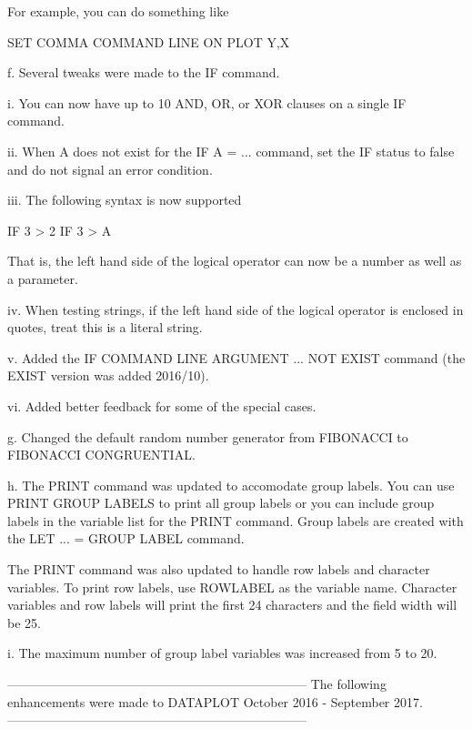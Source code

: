        For example, you can do something like

          SET COMMA COMMAND LINE ON
          PLOT Y,X

    f. Several tweaks were made to the IF command.

          i. You can now have up to 10 AND, OR, or XOR clauses on a
             single IF command.

         ii. When A does not exist for the IF A = ... command, set the IF
             status to false and do not signal an error condition.

        iii. The following syntax is now supported

                IF 3 > 2
                IF 3 > A

              That is, the left hand side of the logical operator can
              now be a number as well as a parameter.

          iv. When testing strings, if the left hand side of the logical
              operator is enclosed in quotes, treat this is a literal
              string.

           v. Added the IF COMMAND LINE ARGUMENT ... NOT EXIST command
              (the EXIST version was added 2016/10).

          vi. Added better feedback for some of the special cases.

    g. Changed the default random number generator from FIBONACCI to
       FIBONACCI CONGRUENTIAL.

    h. The PRINT command was updated to accomodate group labels.  You
       can use PRINT GROUP LABELS to print all group labels or you
       can include group labels in the variable list for the PRINT
       command.  Group labels are created with the LET ... = GROUP LABEL
       command.

       The PRINT command was also updated to handle row labels and
       character variables.  To print row labels, use ROWLABEL as the
       variable name.  Character variables and row labels will print the
       first 24 characters and the field width will be 25.

    i. The maximum number of group label variables was increased from 5
       to 20.

-----------------------------------------------------------------------
The following enhancements were made to DATAPLOT
October 2016 - September 2017.
-----------------------------------------------------------------------

